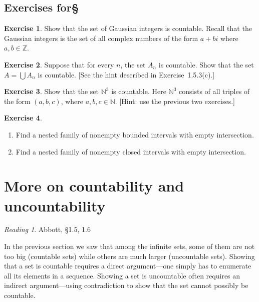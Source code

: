 \documentclass[11pt,oneside]{amsbook}
\newcommand{\N}{\mathbb N}
\newcommand{\Z}{\mathbb Z}
\theoremstyle{definition}
\newtheorem{exerc}{Exercise}[section]
\theoremstyle{plain}
\theoremstyle{definition}
\theoremstyle{remark}
\newtheorem*{reading}{Reading}
\numberwithin{equation}{section}
\numberwithin{figure}{section}
\begin{document}
\newpage
\subsection*{Exercises for\S \thesection}

\begin{exerc}
  Show that the set of Gaussian integers is countable. Recall that the Gaussian integers is the set of all complex numbers of the form $a+bi$ where $a,b\in\Z$.
\end{exerc}

\begin{exerc}
  Suppose that for every $n$, the set $A_n$ is countable. Show that the set $A=\bigcup A_n$ is countable. [See the hint described in Exercise~1.5.3(c).]
\end{exerc}

\begin{exerc}
  Show that the set $\N^3$ is countable. Here $\N^3$ consists of all triples of the form $(a,b,c)$, where $a,b,c\in\N$. [Hint: use the previous two exercises.]
\end{exerc}

\begin{exerc}
  \begin{enumerate}
    \item Find a nested family of nonempty bounded intervals with empty intersection.
    \item Find a nested family of nonempty closed intervals with empty intersection.
  \end{enumerate}
\end{exerc}

\newpage
\section{More on countability and uncountability}

\begin{reading}
  Abbott, \S 1.5, 1.6
\end{reading}

In the previous section we saw that among the infinite sets, some of them are not too big (countable sets) while others are much larger (uncountable sets). Showing that a set is countable requires a direct argument---one simply has to enumerate all its elements in a sequence. Showing a set is uncountable often requires an indirect argument---using contradiction to show that the set cannot possibly be countable.
\end{document}

